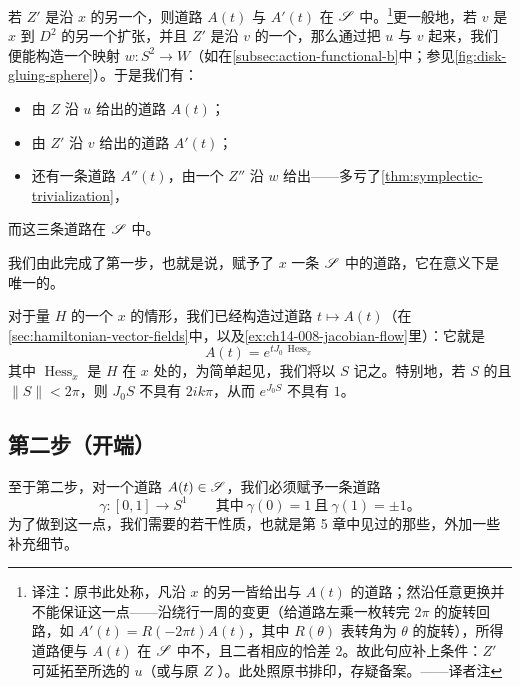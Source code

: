 若 $Z'$ 是沿 $x$ 的另一个\trSymplecticFrame，则道路 $A(t)$ 与 $A'(t)$ 在 $\mathscr{S}$ 中\trHomotopic。\footnote{译注：原书此处称，凡沿 $x$ 的另一\trSymplecticFrame{}皆给出与 $A(t)$ \trHomotopic{}的道路；然沿\trLoop{}任意更换\trSymplecticFrame{}并不能保证这一点——沿\trLoop{}绕行一周的\trSymplecticFrame{}变更（给道路左乘一枚转完 $2\pi$ 的旋转回路，如 $A'(t)=R(-2\pi t)A(t)$，其中 $R(\theta)$ 表转角为 $\theta$ 的旋转），所得道路便与 $A(t)$ 在 $\mathscr{S}$ 中不\trHomotopic，且二者相应的\trIndex{}恰差 $2$。故此句应补上条件：$Z'$ 可延拓至所选的\trCappingDisk{} $u$（或与原\trSymplecticFrame{} $Z$ \trHomotopy）。此处照原书排印，存疑备案。——译者注}更一般地，若 $v$ 是 $x$ 到\trDisk{} $D^2$ 的另一个扩张，并且 $Z'$ 是沿 $v$ 的一个\trTrivialization，那么通过把 $u$ 与 $v$ \trGluing{}起来，我们便能构造一个映射 $w\colon S^2\to W$（如在\cref{subsec:action-functional-b}中；参见\cref{fig:disk-gluing-sphere}）。于是我们有：
\begin{itemize}
\item 由\trTrivialization{} $Z$ 沿 $u$ 给出的道路 $A(t)$；
\item 由 $Z'$ 沿 $v$ 给出的道路 $A'(t)$；
\item 还有一条道路 $A''(t)$，由一个\trTrivialization{} $Z''$ 沿 $w$ 给出——多亏了\cref{thm:symplectic-trivialization}，
\end{itemize}
而这三条道路在 $\mathscr{S}$ 中\trHomotopic。

我们由此完成了第一步，也就是说，赋予了\trTrajectory{} $x$ 一条 $\mathscr{S}$ 中的道路，它在\trHomotopy{}意义下是唯一的。

\begin{remark}\label{thm:autonomous-hessian-path}
对于\trAutonomous{}\trHamiltonian{}量 $H$ 的一个\trCriticalPoint{} $x$ 的情形，我们已经构造过道路 $t\mapsto A(t)$（在\cref{sec:hamiltonian-vector-fields}中，以及\cref{ex:ch14-008-jacobian-flow}里）：它就是
\[
A(t)=e^{tJ_0\,\operatorname{Hess}_x}
\]
其中 $\operatorname{Hess}_x$ 是 $H$ 在 $x$ 处的\trHessian，为简单起见，我们将以 $S$ 记之。特别地，若 $S$ \trNonsingular{}的且 $\|S\|<2\pi$，则 $J_0S$ 不具有\trEigenvalue{} $2ik\pi$，从而 $e^{J_0S}$ 不具有\trEigenvalue{} $1$。
\end{remark}

\subsection{第二步（开端）}
\label{subsec:second-step-beginning}

至于第二步，对一个道路 $A(t)\in\mathscr{S}$，我们必须赋予一条道路
\[
\gamma\colon[0,1]\longrightarrow S^1\qquad\text{其中}\ \gamma(0)=1\ \text{且}\ \gamma(1)=\pm1\text{。}
\]
为了做到这一点，我们需要\trSymplecticGroup{}的若干性质，也就是第 5 章中见过的那些，外加一些补充细节。

